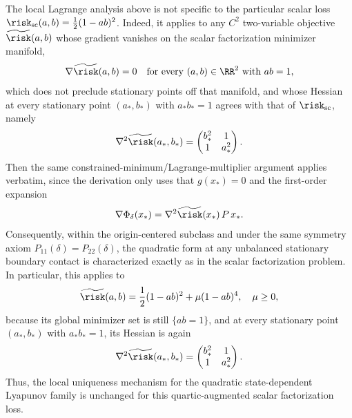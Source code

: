 \documentclass{article}
\begin{document}
\begin{remark}\label{rmk:ext_to_quartic}
The local Lagrange analysis above is not specific to the particular scalar loss
$\risk_{\mathrm{sc}}(a,b)=\frac12(1-ab)^2$. Indeed, it applies to any $C^2$
two-variable objective $\widetilde{\risk}(a,b)$ whose gradient vanishes on the
scalar factorization minimizer manifold,
\begin{align}
    \nabla \widetilde{\risk}(a,b)=0
    \quad\text{for every } (a,b)\in\RR^2 \text{ with } ab=1,
\end{align}
which does not preclude stationary points off that manifold, 
and whose Hessian at every stationary point $(a_*,b_*)$ with $a_*b_* = 1$ agrees with that of
$\risk_{\mathrm{sc}}$, namely
\begin{align}
    \nabla^2 \widetilde{\risk}(a_*,b_*)
    =
    \begin{pmatrix}
        b_*^2 & 1\\
        1 & a_*^2
    \end{pmatrix}.
\end{align}
Then the same constrained-minimum/Lagrange-multiplier argument applies verbatim,
since the derivation only uses that $g(x_*)=0$ and the first-order expansion
\begin{align}
    \nabla \Phi_\delta(x_*) = \nabla^2 \widetilde{\risk}(x_*)\, P\, x_*.
\end{align}
Consequently, within the origin-centered subclass and under the same symmetry
axiom $P_{11}(\delta)=P_{22}(\delta)$, the quadratic form at any unbalanced
stationary boundary contact is characterized exactly as in the scalar
factorization problem. In particular, this applies to
\begin{align}
    \widetilde{\risk}(a,b)
    =
    \frac12(1-ab)^2 + \mu(1-ab)^4,
    \quad \mu \ge 0,
\end{align}
because its global minimizer set is still $\{ab=1\}$, and at every stationary point
$(a_*,b_*)$ with $a_*b_*=1$, its Hessian is again
\begin{align}
    \nabla^2 \widetilde{\risk}(a_*,b_*)
    =
    \begin{pmatrix}
        b_*^2 & 1\\
        1 & a_*^2
    \end{pmatrix}.
\end{align}
Thus, the local uniqueness mechanism for the quadratic state-dependent Lyapunov
family is unchanged for this quartic-augmented scalar factorization loss.
\end{remark}
\end{document}
